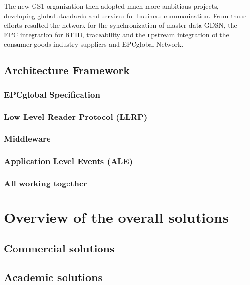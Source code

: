 The new GS1 organization then adopted much more ambitious projects, developing global standards and services for business communication.
From those efforts resulted the network for the synchronization of master data \gls{GDSN}, the \gls{EPC} integration for \gls{RFID}, traceability and the upstream integration of the consumer goods industry suppliers and EPCglobal Network.

\subsection{Architecture Framework}


\subsubsection{EPCglobal Specification} \label{epcglobal}


\subsubsection{Low Level Reader Protocol (LLRP)}


\subsubsection{Middleware}


\subsubsection{Application Level Events (ALE)}


\subsubsection{All working together}


\section{Overview of the overall solutions}

\subsection{Commercial solutions}


\subsection{Academic solutions}

